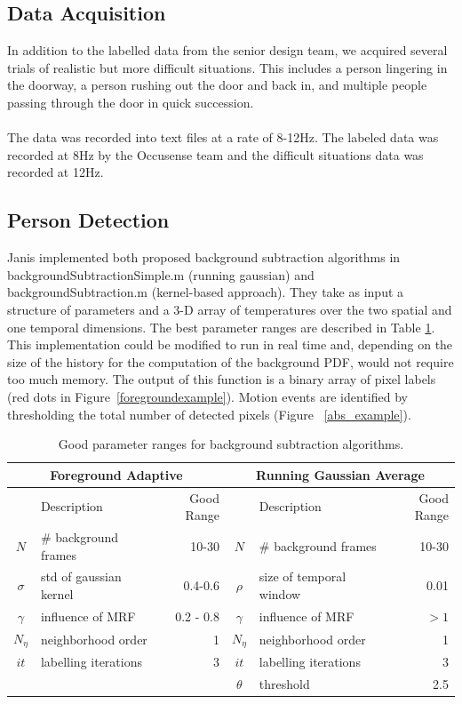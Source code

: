 \documentclass[12pt,oneside]{article} %
\begin{document}
\subsection{Data Acquisition}  %
In addition to the labelled data from the senior design team, we acquired several trials of realistic but more
difficult situations. This includes a person lingering in the doorway, a person rushing out the door and back in, and multiple people passing through
the door in quick succession.
\\ \\
The data was recorded into text files at a rate of 8-12Hz. The labeled data was recorded at 8Hz
by the Occusense team and the difficult situations data was recorded at 12Hz.

\subsection{Person Detection}
Janis implemented both proposed background subtraction algorithms in backgroundSubtractionSimple.m 
(running gaussian) and backgroundSubtraction.m (kernel-based approach).
They take as input a structure of parameters
and a 3-D array of temperatures over the two spatial and one temporal dimensions. 
The best parameter ranges are described in Table \ref{bs_paramstable}.
This implementation could
be modified to run in real time and, depending on the size of the history for the computation of the background
PDF, would not require too much memory. The output of this function is a binary array of pixel labels 
(red dots in Figure~\ref{foregroundexample}). Motion events are identified by
thresholding the total number of detected pixels (Figure~ \ref{abs_example}).
\begin{table}[htb]\begin{tabular}{|clr|clr|}
\hline
\multicolumn{3}{|c|}{Foreground Adaptive} & \multicolumn{3}{|c|}{Running Gaussian Average}\\
\hline
& Description & Good Range & & Description & Good Range\\
\hline
$N$ & \# background frames & 10-30 & $N$ & \# background frames & 10-30\\
$\sigma$ & std of gaussian kernel & 0.4-0.6 & $\rho$ & size of temporal window & 0.01\\
$\gamma$ & influence of MRF & 0.2 - 0.8 & $\gamma$ & influence of MRF & $>1$\\
$N_\eta$ & neighborhood order & 1 & $N_\eta$ & neighborhood order & 1\\
$it$ & labelling iterations & 3 & $it$ & labelling iterations & 3\\
 &  &  & $\theta$ & threshold & 2.5\\
\hline
\end{tabular}
\caption{Good parameter ranges for background subtraction algorithms.}
\label{bs_paramstable}
\end{table}
\end{document}
